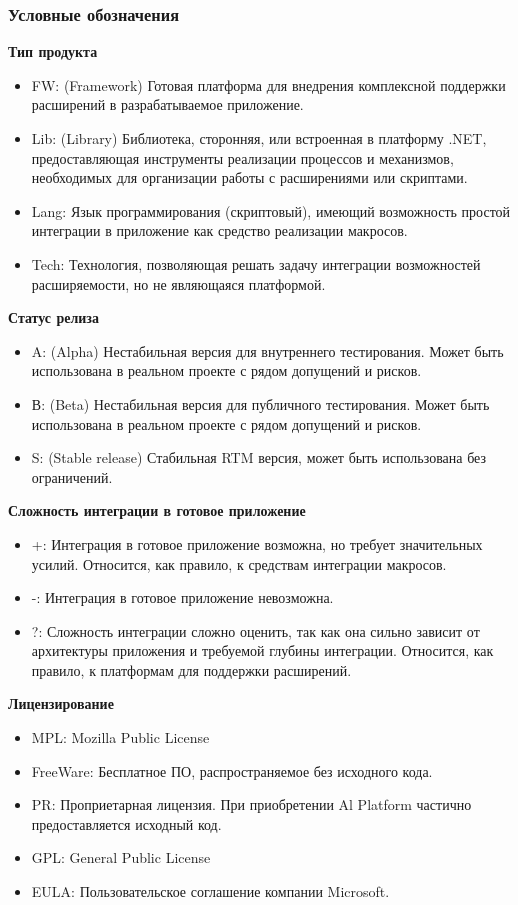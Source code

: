 \subsubsection{Условные обозначения}

{\bf Тип продукта}

\begin{itemize}
	\item FW: (Framework) Готовая платформа для внедрения комплексной поддержки расширений в разрабатываемое приложение.
	\item Lib: (Library) Библиотека, сторонняя, или встроенная в платформу .NET, предоставляющая инструменты реализации процессов и механизмов, необходимых для организации работы с расширениями или скриптами.
	\item Lang: Язык программирования (скриптовый), имеющий возможность простой интеграции в приложение как средство реализации макросов. 
	\item Tech: Технология, позволяющая решать задачу интеграции возможностей расширяемости, но не являющаяся платформой.
\end{itemize}

{\bf Статус релиза}

\begin{itemize}
	\item A: (Alpha) Нестабильная версия для внутреннего тестирования. Может быть использована в реальном проекте с рядом допущений и рисков.
	\item В: (Beta) Нестабильная версия для публичного тестирования. Может быть использована в реальном проекте с рядом допущений и рисков.
	\item S: (Stable release) Стабильная RTM версия, может быть использована без ограничений.
\end{itemize}

{\bf Сложность интеграции в готовое приложение}

\begin{itemize}
	\item +: Интеграция в готовое приложение возможна, но требует значительных усилий. Относится, как правило, к средствам интеграции макросов.
	\item -: Интеграция в готовое приложение невозможна.
	\item ?: Сложность интеграции сложно оценить, так как она сильно зависит от архитектуры приложения и требуемой глубины интеграции. Относится, как правило, к платформам для поддержки расширений.
\end{itemize}

{\bf Лицензирование}

\begin{itemize}
	\item MPL: Mozilla Public License
	\item FreeWare: Бесплатное ПО, распространяемое без исходного кода.
	\item PR: Проприетарная лицензия. При приобретении Al Platform частично предоставляется исходный код.
	\item GPL: General Public License
	\item EULA: Пользовательское соглашение компании Microsoft.
\end{itemize}
